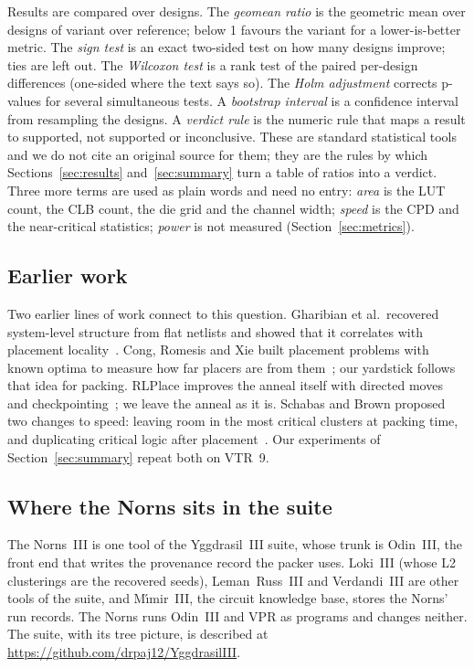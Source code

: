 Results are compared over designs. The \emph{geomean ratio} is the geometric mean over designs of variant over reference; below 1 favours the variant for a lower-is-better metric. %
The \emph{sign test} is an exact two-sided test on how many designs improve; ties are left out. %
The \emph{Wilcoxon test} is a rank test of the paired per-design differences (one-sided where the text says so). %
The \emph{Holm adjustment} corrects p-values for several simultaneous tests. %
A \emph{bootstrap interval} is a confidence interval from resampling the designs. %
A \emph{verdict rule} is the numeric rule that maps a result to supported, not supported or inconclusive. %
These are standard statistical tools and we do not cite an original source for them; they are the rules by which Sections~\ref{sec:results} and~\ref{sec:summary} turn a table of ratios into a verdict. Three more terms are used as plain words and need no entry: \emph{area} is the LUT count, the CLB count, the die grid and the channel width; \emph{speed} is the CPD and the near-critical statistics; \emph{power} is not measured (Section~\ref{sec:metrics}).

\subsection{Earlier work}

Two earlier lines of work connect to this question. Gharibian et al.\ recovered system-level structure from flat netlists and showed that it correlates with placement locality~\cite{gharibian2010finding,gharibian2013analyzing,gharibian2014identifying}. Cong, Romesis and Xie built placement problems with known optima to measure how far placers are from them~\cite{Cong03tpeko}; our yardstick follows that idea for packing. RLPlace improves the anneal itself with directed moves and checkpointing~\cite{elgammal2022rlplace}; we leave the anneal as it is. Schabas and Brown proposed two changes to speed: leaving room in the most critical clusters at packing time, and duplicating critical logic after placement~\cite{schabas2003duplication}. Our experiments of Section~\ref{sec:summary} repeat both on VTR~9.

\subsection{Where the Norns sits in the suite}

The Norns~III is one tool of the Yggdrasil~III suite, whose trunk is Odin~III, the front end that writes the provenance record the packer uses. Loki~III (whose L2 clusterings are the recovered seeds), Leman~Russ~III and Verdandi~III are other tools of the suite, and M\'{\i}mir~III, the circuit knowledge base, stores the Norns' run records. The Norns runs Odin~III and VPR as programs and changes neither. The suite, with its tree picture, is described at \url{https://github.com/drpaj12/YggdrasilIII}.
